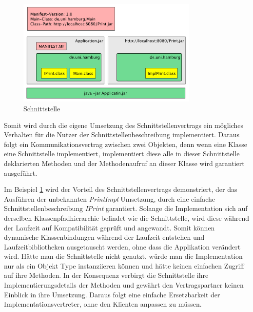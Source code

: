   \begin{figure}[h!]
    \centering
    \includegraphics[width=0.8\textwidth]{material/images/Classpath-Interface-Implimentation.pdf}
    \caption{Schnittstelle}
    \label{fig:schnitt}
  \end{figure}

  Somit wird durch die eigene Umsetzung des Schnittstellenvertrags ein mögliches Verhalten für die Nutzer der Schnittstellenbeschreibung implementiert. Daraus folgt ein Kommunikationsvertrag zwischen zwei Objekten, denn wenn eine Klasse eine Schnittstelle implementiert, implementiert diese alle in dieser Schnittstelle deklarierten Methoden und der Methodenaufruf an dieser Klasse wird garantiert ausgeführt.\cite{bloch2017effective}\bigbreak 
  
  Im Beispiel \ref{fig:schnitt} wird der Vorteil des Schnittstellenvertrags demonstriert, der das Ausführen der unbekannten \textit{PrintImpl} Umsetzung, durch eine einfache Schnittstellenbeschreibung \textit{IPrint} garantiert. Solange die Implementation sich auf derselben Klassenpfadhierarchie befindet wie die Schnittstelle, wird diese während der Laufzeit auf Kompatibilität geprüft und angewandt. Somit können dynamische Klassenbindungen während der Laufzeit entstehen und Laufzeitbibliotheken ausgetauscht werden, ohne dass die Applikation verändert wird. Hätte man die Schnittstelle nicht genutzt, würde man die Implementation nur als ein Objekt Type instanziieren können und hätte keinen einfachen Zugriff auf ihre Methoden. In der Konsequenz verbirgt die Schnittstelle ihre Implementierungsdetails der Methoden und gewährt den Vertragspartner keinen Einblick in ihre Umsetzung. Daraus folgt eine einfache Ersetzbarkeit der Implementationsvertreter, ohne den Klienten anpassen zu müssen. \cite{Forman04javareflection}

